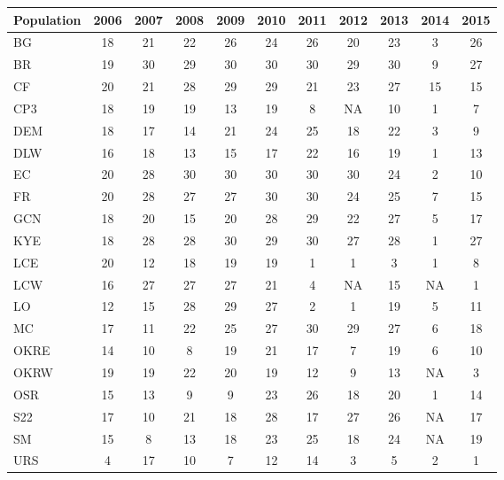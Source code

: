 \documentclass[12pt, oneside, titlepage]{article}   	%
\begin{document}
 \newpage
 

 \label{tab:sigma} 
\begin{table}[ht]
\centering
\begin{tabular}{lcccccccccc}
  \hline
Population & 2006 & 2007 & 2008 & 2009 & 2010 & 2011 & 2012 & 2013 & 2014 & 2015 \\ 
  \hline
BG &  18 &  21 &  22 &  26 &  24 &  26 &  20 &  23 &   3 &  26 \\ 
  BR &  19 &  30 &  29 &  30 &  30 &  30 &  29 &  30 &   9 &  27 \\ 
  CF &  20 &  21 &  28 &  29 &  29 &  21 &  23 &  27 &  15 &  15 \\ 
  CP3 &  18 &  19 &  19 &  13 &  19 &   8 & NA &  10 &   1 &   7 \\ 
  DEM &  18 &  17 &  14 &  21 &  24 &  25 &  18 &  22 &   3 &   9 \\ 
  DLW &  16 &  18 &  13 &  15 &  17 &  22 &  16 &  19 &   1 &  13 \\ 
  EC &  20 &  28 &  30 &  30 &  30 &  30 &  30 &  24 &   2 &  10 \\ 
  FR &  20 &  28 &  27 &  27 &  30 &  30 &  24 &  25 &   7 &  15 \\ 
  GCN &  18 &  20 &  15 &  20 &  28 &  29 &  22 &  27 &   5 &  17 \\ 
  KYE &  18 &  28 &  28 &  30 &  29 &  30 &  27 &  28 &   1 &  27 \\ 
  LCE &  20 &  12 &  18 &  19 &  19 &   1 &   1 &   3 &   1 &   8 \\ 
  LCW &  16 &  27 &  27 &  27 &  21 &   4 & NA &  15 & NA &   1 \\ 
  LO &  12 &  15 &  28 &  29 &  27 &   2 &   1 &  19 &   5 &  11 \\ 
  MC &  17 &  11 &  22 &  25 &  27 &  30 &  29 &  27 &   6 &  18 \\ 
  OKRE &  14 &  10 &   8 &  19 &  21 &  17 &   7 &  19 &   6 &  10 \\ 
  OKRW &  19 &  19 &  22 &  20 &  19 &  12 &   9 &  13 & NA &   3 \\ 
  OSR &  15 &  13 &   9 &   9 &  23 &  26 &  18 &  20 &   1 &  14 \\ 
  S22 &  17 &  10 &  21 &  18 &  28 &  17 &  27 &  26 & NA &  17 \\ 
  SM &  15 &   8 &  13 &  18 &  23 &  25 &  18 &  24 & NA &  19 \\ 
  URS &   4 &  17 &  10 &   7 &  12 &  14 &   3 &   5 &   2 &   1 \\ 
   \hline
\end{tabular}
\end{table}
\end{document}
